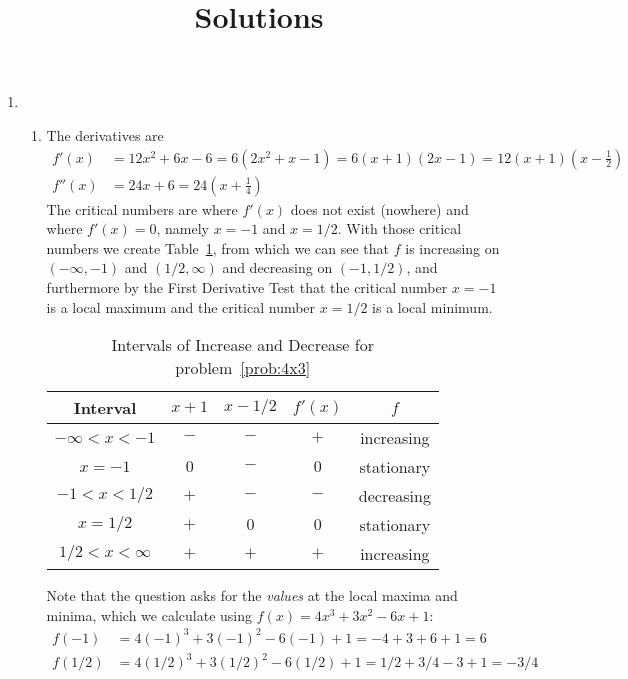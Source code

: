 \documentclass{article}
\title{\commonPSTitleZeroThreeThree\ Solutions}
\author{\commonAuthor}
\date{\commonDateZeroThreeThree}
\begin{document}
\maketitle
\begin{enumerate}
\item %
  \begin{enumerate}
  \item\label{prob:4x3} %
    The derivatives are
    \begin{align*}
      f'(x) &= 12x^2+6x-6 = 6(2x^2+x-1)=6(x+1)(2x-1)
        =12(x+1)\left(x-\frac{1}{2}\right)
      \\
      f''(x) &= 24x+6 = 24\left(x+\frac{1}{4}\right)
    \end{align*}
    The critical numbers are where $f'(x)$ does not exist (nowhere)
    and where $f'(x)=0$, namely $x=-1$ and $x=1/2$.  With those
    critical numbers we create Table~\ref{tab:4x3fp}, from which we
    can see that $f$ is increasing on $(-\infty,-1)$ and
    $(1/2,\infty)$ and decreasing on $(-1,1/2)$, and furthermore by
    the First Derivative Test that the critical number $x=-1$ is a
    local maximum and the critical number $x=1/2$ is a local minimum.
    \begin{table}[htbp]
      \centering
      \begin{tabular}{|c|c|c|c|c|}
        \hline
        Interval       & $x+1$ & $x-1/2$ & $f'(x)$ & $f$
        \\
        \hline\hline
        $-\infty<x<-1$ & $-$   & $-$     & $+$     & increasing
        \\
        \hline
        $x=-1$         & $0$   & $-$     & $0$     & stationary
        \\
        \hline
        $-1<x<1/2$     & $+$   & $-$     & $-$     & decreasing
        \\
        \hline
        $x=1/2$        & $+$   & $0$     & $0$     & stationary
        \\
        \hline
        $1/2<x<\infty$ & $+$   & $+$     & $+$     & increasing
        \\
        \hline
      \end{tabular}
      \caption{Intervals of Increase and Decrease for problem~\ref{prob:4x3}}
      \label{tab:4x3fp}
    \end{table}
    Note that the question asks for the \emph{values} at the local
    maxima and minima, which we calculate using $f(x)=4x^3+3x^2-6x+1$:
    \begin{align*}
      f(-1)&=4(-1)^3+3(-1)^2-6(-1)+1=-4+3+6+1=6 \\
      f(1/2) &= 4(1/2)^3+3(1/2)^2-6(1/2)+1=1/2+3/4-3+1=-3/4
    \end{align*}


\end{enumerate}
\end{enumerate}
\end{document}
